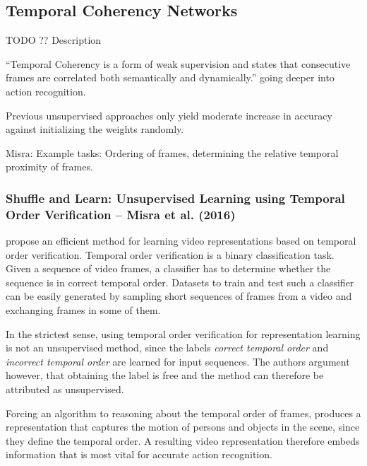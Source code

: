 \subsection{Temporal Coherency Networks}
TODO ?? Description

``Temporal Coherency is a form of weak supervision and states that consecutive frames are correlated both semantically and dynamically.'' going deeper into action recognition.

Previous unsupervised approaches only yield moderate increase in accuracy against initializing the weights randomly.

Misra:
Example tasks: Ordering of frames, determining the relative temporal proximity of frames.


\subsubsection[Shuffle and Learn: Unsupervised Learning using Temporal Order Verification (2016)]{Shuffle and Learn: Unsupervised Learning using Temporal Order Verification -- Misra et al. (2016)}
\textcite{misra_shuffle_2016} propose an efficient method for learning video representations based on temporal order verification.
Temporal order verification is a binary classification task.
Given a sequence of video frames, a classifier has to determine whether the sequence is in correct temporal order.
Datasets to train and test such a classifier can be easily generated by sampling short sequences of frames from a video and exchanging frames in some of them.

In the strictest sense, using temporal order verification for representation learning is not an unsupervised method, since the labels \textit{correct temporal order} and \textit{incorrect temporal order} are learned for input sequences.
The authors argument however, that obtaining the label is free and the method can therefore be attributed as unsupervised.

Forcing an algorithm to reasoning about the temporal order of frames, produces a representation that captures the motion of persons and objects in the scene, since they define the temporal order.
A resulting video representation therefore embeds information that is most vital for accurate action recognition.

